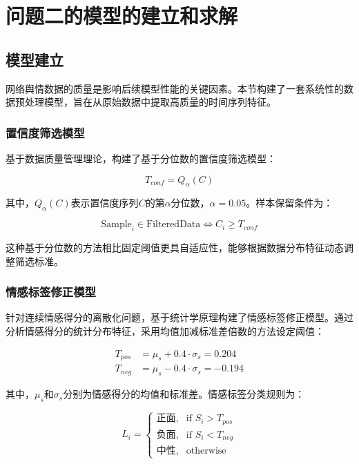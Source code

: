 \documentclass[withoutpreface,bwprint]{cumcmthesis}
\begin{document}
\section{问题二的模型的建立和求解}
\subsection{模型建立}

网络舆情数据的质量是影响后续模型性能的关键因素。本节构建了一套系统性的数据预处理模型，旨在从原始数据中提取高质量的时间序列特征。

\subsubsection{置信度筛选模型}

基于数据质量管理理论，构建了基于分位数的置信度筛选模型：

\begin{equation}
\label{eq:confidence_filter}
T_{conf} = Q_{\alpha}(C)
\end{equation}

其中，$Q_{\alpha}(C)$表示置信度序列$C$的第$\alpha$分位数，$\alpha = 0.05$。样本保留条件为：

\begin{equation}
\label{eq:sample_retention}
\text{Sample}_i \in \text{FilteredData} \iff C_i \geq T_{conf}
\end{equation}

这种基于分位数的方法相比固定阈值更具自适应性，能够根据数据分布特征动态调整筛选标准。

\subsubsection{情感标签修正模型}

针对连续情感得分的离散化问题，基于统计学原理构建了情感标签修正模型。通过分析情感得分的统计分布特征，采用均值加减标准差倍数的方法设定阈值：

\begin{equation}
\label{eq:sentiment_thresholds}
\begin{aligned}
T_{pos} &= \mu_s + 0.4 \cdot \sigma_s = 0.204 \\
T_{neg} &= \mu_s - 0.4 \cdot \sigma_s = -0.194
\end{aligned}
\end{equation}

其中，$\mu_s$和$\sigma_s$分别为情感得分的均值和标准差。情感标签分类规则为：

\begin{equation}
\label{eq:sentiment_classification}
L_i = \begin{cases}
\text{正面}, & \text{if } S_i > T_{pos} \\
\text{负面}, & \text{if } S_i < T_{neg} \\
\text{中性}, & \text{otherwise}
\end{cases}
\end{equation}
\end{document}
